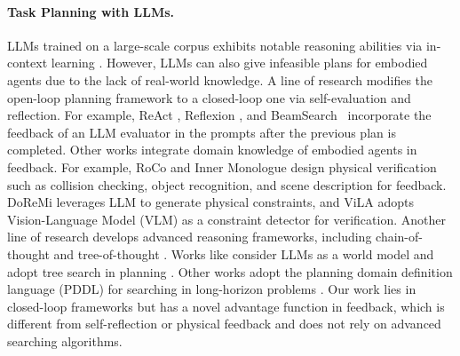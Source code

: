\documentclass[11pt]{article}
\theoremstyle{plain}
\theoremstyle{remark}
\begin{document}
\paragraph{Task Planning with LLMs.} LLMs \citep{chowdhery2023palm,openAI2023GPT,touvron2023llama1,touvron2023llama2} trained on a large-scale corpus exhibits notable reasoning abilities via in-context learning \citep{dong2022survey,abernethy2023mechanism,akyurek2023what}. However, LLMs can also give infeasible plans for embodied agents due to the lack of real-world knowledge. A line of research modifies the open-loop planning framework to a closed-loop one via self-evaluation and reflection. For example, ReAct \citep{yao2023react}, Reflexion \citep{shinn2023reflexion}, and BeamSearch~\citep{xie2023beam} incorporate the feedback of an LLM evaluator in the prompts after the previous plan is completed. Other works integrate domain knowledge of embodied agents in feedback. For example, RoCo \citep{mandi2023roco} and Inner Monologue \citep{huang2022Monologue} design physical verification such as collision checking, object recognition, and scene description for feedback. DoReMi \citep{guo2023DoReMi} leverages LLM to generate physical constraints, and ViLA \citep{hu2023look} adopts Vision-Language Model (VLM) as a constraint detector for verification. Another line of research develops advanced reasoning frameworks, including chain-of-thought \citep{wei2023chainofthought,mu2023embodiedgpt} and tree-of-thought \citep{yao2023tree}.
Works like \citep{zhao2023large,hao2023reasoning} consider LLMs as a world model \citep{ano2023learning} and adopt tree search in planning \citep{hu2023tree}. 
Other works adopt the planning domain definition language (PDDL) for searching in long-horizon problems \citep{silver2023PDDL,liu2023llm+p,zhou2023isr}. 
Our work lies in closed-loop frameworks but has a novel advantage function in feedback, which is different from self-reflection or physical feedback and does not rely on advanced searching algorithms. 
\end{document}

